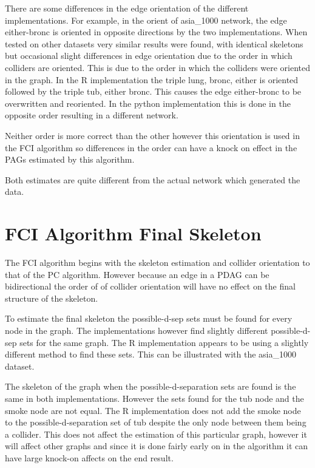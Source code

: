 \documentclass{UoYCSproject}
\begin{document}
There are some differences in the edge orientation of the different implementations. For example, in the orient of asia\_1000 network, the edge either-bronc is oriented in opposite directions by the two implementations. When tested on other datasets very similar results were found, with identical skeletons but occasional slight differences in edge orientation due to the order in which colliders are oriented. This is due to the order in which the colliders were oriented in the graph. In the R implementation the triple lung, bronc, either is oriented followed by the triple tub, either bronc. This causes the edge either-bronc to be overwritten and reoriented. In the python implementation this is done in the opposite order resulting in a different network.

Neither order is more correct than the other however this orientation is used in the FCI algorithm so differences in the order can have a  knock on effect in the PAGs estimated by this algorithm.

Both estimates are quite different from the actual network which generated the data.

\section{FCI Algorithm Final Skeleton}
The FCI algorithm begins with the skeleton estimation and collider orientation to that of the PC algorithm. However because an edge in a PDAG can be bidirectional the order of of collider orientation will have no effect on the final structure of the skeleton.

To estimate the final skeleton the possible-d-sep sets must be found for every node in the graph. The implementations however find slightly different possible-d-sep sets for the same graph. The R implementation appears to be using a slightly different method to find these sets. This can be illustrated with the asia\_1000 dataset.

The skeleton of the graph when the possible-d-separation sets are found is the same in both implementations. However the sets found for the tub node and the smoke node are not equal. The R implementation does not add the smoke node to the possible-d-separation set of tub despite the only node between them being a collider. This does not affect the estimation of this particular graph, however it will affect other graphs and since it is done fairly early on in the algorithm it can have large knock-on affects on the end result.
\end{document}
